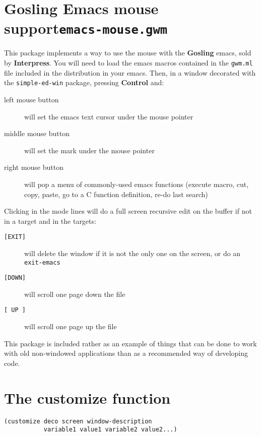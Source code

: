 \section{Gosling Emacs mouse support\hfill{\tt emacs-mouse.gwm}}
\label{emacs-mouse}

This package implements a way to use the mouse with the {\bf Gosling} emacs,
sold by {\bf Interpress}. You will need to load the emacs macros contained
in the {\tt gwm.ml} file included in the distribution in your emacs. Then,
in a window decorated with the {\tt simple-ed-win} package, pressing
{\bf Control} and:

\begin{description}
\item[left mouse button] will set the emacs text cursor under the mouse
pointer
\item[middle mouse button] will set the mark under the mouse pointer
\item[right mouse button] will pop a menu of commonly-used emacs functions
(execute macro, cut, copy, paste, go to a C function definition, re-do last
search)
\end{description}

Clicking in the mode lines will do a full screen recursive edit on the
buffer if not in a target and in the targets:

\begin{description}
\item[{\tt [EXIT]}] will delete the window if it is not the only one on
the screen, or do an {\tt exit-emacs}
\item[{\tt [DOWN]}] will scroll one page down the file
\item[{\tt [ UP ]}] will scroll one page up the file
\end{description}

This package is included rather as an example of things that can be done
to work with old non-windowed applications than as a recommended way of
developing code.

\section{The customize function}
\label{customize}

{\usagefont\begin{verbatim}
(customize deco screen window-description
           variable1 value1 variable2 value2...)
\end{verbatim}}\usageupspace

